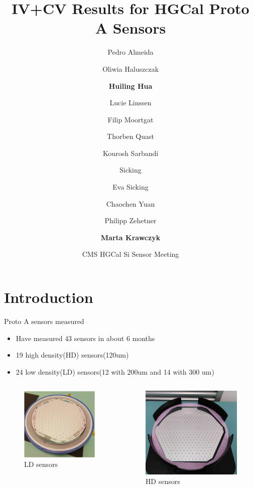 \documentclass{beamer}
\title[Proto-A Sensors] %
{IV+CV Results for HGCal Proto A Sensors}
\author[Huiling Hua] %
{ Pedro Almeida\and Oliwia Haluszczak\and \textbf{Huiling Hua} \and Lucie Linssen\and Filip Moortgat\and Thorben Quast\and Kourosh Sarbandi\and Sicking\and Eva Sicking\and
Chaochen Yuan\and Philipp Zehetner\and \textbf{Marta Krawczyk} }
\date[2022.02.10] %
{CMS HGCal Si Sensor Meeting}
\begin{document}
\begin{frame}
  \titlepage
\end{frame}

\section{Introduction}

\begin{frame}{Proto A sensors measured}
    \begin{itemize}
        \item Have measured \alert{43 sensors} in about \alert{6 months} 
        \item 19 high density(HD) sensors(120um) 
        \item 24 low density(LD) sensors(12 with 200um and 14 with 300 um)
    \end{itemize}

    \begin{columns}
        \begin{figure}
            \includegraphics[width=.6\textwidth]{plots/LDsensors.png}
            \caption{LD sensors}
        \end{figure}
        \begin{figure}
            \includegraphics[width=.6\textwidth]{plots/HDsensors.png}
            \caption{HD sensors}
        \end{figure}
    \end{columns}

\end{frame}
\end{document}
